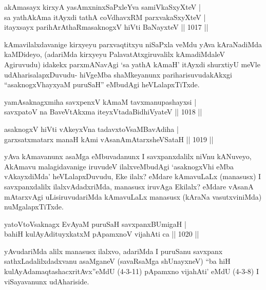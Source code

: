 
\begin{shl}
akAmasayx kirxyA yasAmxninxSaPxleYva samiVkaSxyXteV | \\
sa yathAkAma itAyxdi tathA coVdhavxRM parxvakaSxyXteV | \\
itayxsayx parihArAthaRmasaknogxV hiVti BaNayxteV \hfill||  1017 ||  
\end{shl}

\begin{artha}
kAmavilalxdavanige kirxyeyu parxvaqtitxyu niSaPxla veMdu yAva kAraNadiMda kaMDideyo, (adariMda kirxyeyu PalavatAtxgiruvalilx kAmadiMdaleV Agiruvudu) idakekx parxmANavAgi `sa yathA kAmaH' itAyxdi shurxtiyU meVle udAharisalapxDuvudu- hiVgeMba shaMkeyanunx pariharisuvudakAkxgi ``asaknogxVhayxyaM puruSaH'' eMbudAgi heVLalapxTiTxde.
\end{artha}


\begin{shl}
yamAsaknagxmiha savxpenxV kAmaM tavxmanupashayxsi | \\
savxpatoV na BaveVtAkxma iteyxVtadaBidhiVyateV \hfill||  1018 ||  
\end{shl}
				
\begin{shl}
asaknogxV hiVti vAkeyxVna tadavxtoV\s saMBavAdiha | \\
garxsatxmatarx manaH kAmi vAsanAmAtarxsheVSataH \hfill||  1019 ||  
\end{shl}

\begin{artha}
yAva kAmavanunx asaMga eMbuvadanunx I savxpanxdalilx niVnu kANuveyo, AkAmavu malagidavanige iruvudeV ilalxveMbudAgi `asaknogxVhi eMba vAkayxdiMda' heVLalapxDuvudu, Eke ilalx? eMdare kAmavuLaLx (manasusx) I savxpanxdalilx ilalxvAdadxriMda, manasusx iruvAga Ekilalx? eMdare vAsanA mAtarxvAgi uLisiruvudariMda kAmavuLaLx manasusx (kAraNa vasutxviniMda) nuMgalapxTiTxde.
\end{artha}

\begin{shl}
yatoV\s toV\s saknagx EvAyaM puruSaH savxpanxBUmigaH | \\
bahiH kulAyAdituyxkatxM pApamxnoV vijahAti ca \hfill||  1020 ||  
\end{shl}

\begin{artha}
yAvudariMda alilx manasusx ilalxvo, adariMda I puruSanu savxpanx sathxLadalilxdadxvanu asaMganeV (savaRsaMga shUnayxneV) ``ba hiH kulAyAdamaqtashacxritAvx''eMdU (4-3-11) pApamxno vija{hA}ti' eMdU (4-3-8) I viSayavanunx udAhariside.
\end{artha}

